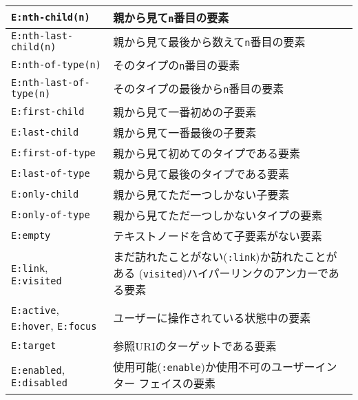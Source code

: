 \begin{longtable}{|m{13em}|m{}|}
\Verb+E:nth-child(n)+&親から見て\texttt{n}番目の要素%
\\\hline
\Verb+E:nth-last-child(n)+&親から見て最後から数えて\texttt{n}番目の要素
\\\hline
\Verb+E:nth-of-type(n)+&そのタイプの\texttt{n}番目の要素%
\\\hline
\Verb+E:nth-last-of-type(n)+&そのタイプの最後から\texttt{n}番目の要素%
\\\hline
\Verb+E:first-child+&親から見て一番初めの子要素%
\\\hline
\Verb+E:last-child+&親から見て一番最後の子要素%
\\\hline
\Verb+E:first-of-type+&親から見て初めてのタイプである要素%
\\\hline
\Verb+E:last-of-type+&親から見て最後のタイプである要素%
\\\hline
\Verb+E:only-child+&親から見てただ一つしかない子要素%
\\\hline
\Verb+E:only-of-type+&親から見てただ一つしかないタイプの要素%
\\\hline
\Verb+E:empty+&テキストノードを含めて子要素がない要素%
\\\hline
\Verb+E:link+, %
\Verb+E:visited+&まだ訪れたことがない(\texttt{:link})か訪れたことがある
     (\texttt{visited})ハイパーリンクのアンカーである要素%
\\\hline
\Verb+E:active+, %
\Verb+E:hover+, %
\Verb+E:focus+&ユーザーに操作されている状態中の要素%
\\\hline
\Verb+E:target+&参照URIのターゲットである要素%
\\\hline
\Verb+E:enabled+, %
\Verb+E:disabled+&使用可能(\texttt{:enable})か使用不可のユーザーインター
     フェイスの要素%
\\\hline

\end{longtable}
